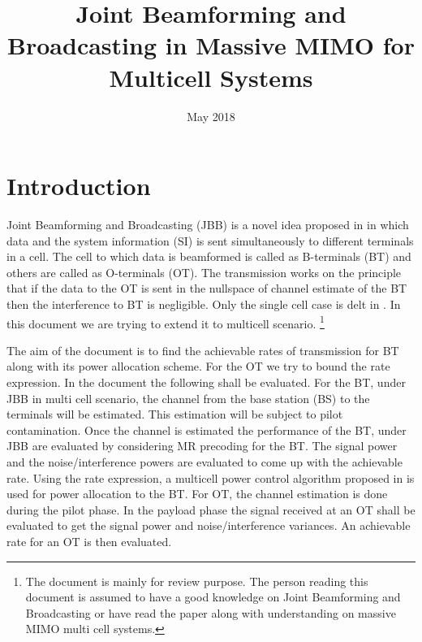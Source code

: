 \documentclass[10pt, a4paper, twoside,fleqn]{article}
\title{Joint Beamforming and Broadcasting in Massive MIMO for Multicell Systems}
\author{}
\date{May 2018}
\begin{document}
\maketitle
 
\section{Introduction}
	Joint Beamforming and Broadcasting (JBB) is a novel idea proposed in \cite{bib:jbb} in which data and the system information (SI) is sent simultaneously to different terminals in a cell. The cell to which data is beamformed is called as B-terminals (BT) and others are called as O-terminals (OT). The transmission works on the principle that if the data to the OT is sent in the nullspace of channel estimate of the BT then the interference to BT is negligible. Only the single cell case is delt in \cite{bib:jbb}. In this document we are trying to extend it to multicell scenario.
\footnote{The document is mainly for review purpose. The person reading this document is assumed to have a good knowledge on Joint Beamforming and Broadcasting or have read the paper \cite{bib:jbb} along with understanding on massive MIMO multi cell systems.}
	
	The aim of the document is to find the achievable rates of transmission for BT along with its power allocation scheme. For the OT we try to bound the rate expression. In the document the following shall be evaluated. For the BT, under JBB in multi cell scenario, the channel from the base station (BS) to the terminals will be estimated. This estimation will be subject to pilot contamination. Once the channel is estimated the performance of the BT, under JBB are evaluated by considering MR precoding for the BT. The signal power and the noise/interference powers are evaluated to come up with the achievable rate. Using the rate expression, a multicell power control algorithm proposed in \cite{bib:MassiveMimoBook} is used for power allocation to the BT.
     For OT, the channel estimation is done during the pilot phase. In the payload phase the signal received at an OT shall be evaluated to get the signal power and noise/interference variances. An achievable rate for an OT is then evaluated.
\end{document}
